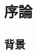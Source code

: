 \begin{comment}
- 主張
オーディオブックの作成にあたり
- 朗読システム
  - オーディオブック
    - 市場の拡大
  - 電子書籍
  - 課題
- 音声合成
  - 感情を込められる
  - 人手によるパラメタ調整
- 感情推定
  - EmotionML
\end{comment}

\chapter{序論}



\section{背景}

%
%
%
%


